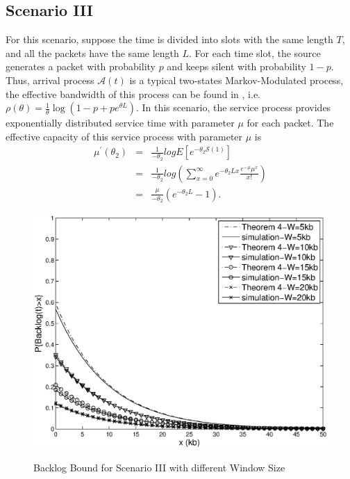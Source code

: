 \documentclass[paper]{ieice}
\begin{document}
\subsection{Scenario III}
For this scenario, suppose the time is divided into slots with the same length $T$, and all the packets have the same length $L$. For each time slot, the source generates a packet with probability $p$ and keeps silent with probability $1-p$. Thus, arrival process $\mathcal{A}(t)$ is a typical two-states Markov-Modulated process, the effective bandwidth of this process can be found in \cite{Chan94}, i.e. $\rho(\theta)=\frac{1}{\theta}\log(1-p+pe^{\theta L})$. In this scenario, the service process provides exponentially distributed service time with parameter $\mu$ for each packet. The effective capacity of this service process with parameter $\mu$ is
\begin{eqnarray*}
\mu^\prime(\theta_2)&=& \frac{1}{-\theta_2}log E[e^{-\theta_2 \mathcal{S}(1)}]\\
&=& \frac{1}{-\theta_2}log(\sum_{x=0}^\infty e^{-\theta_2 Lx}\frac{e^{-\mu}\mu^x}{x!})\\
&=& \frac{\mu}{-\theta_2}(e^{-\theta_2 L}-1).
\end{eqnarray*}
\begin{figure}[tbp]
  \centering
  \includegraphics[scale=0.45]{figures/backlogbuf.eps}\\
  \caption{Backlog Bound for Scenario III with different Window Size}\label{result1}
\end{figure}
\end{document}
